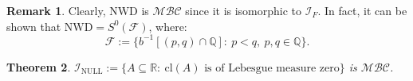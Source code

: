 \documentclass{amsart}
\newtheorem{thm}{Theorem}[section]
\newtheorem{prop}[thm]{Proposition}
\theoremstyle{definition}
\newtheorem{remark}[thm]{Remark}
\theoremstyle{definition}
\newcommand{\N}{{\mathbb N}}
\newcommand{\R}{{\mathbb R}}
\newcommand{\Q}{{\mathbb Q}}
\newcommand{\I}{\mathcal I}
\newcommand{\calI}{\mathcal{I}}
\newcommand{\MB}{S^0}  %
\newcommand{\MBC}{\mathcal{MBC}}
\newcommand{\NWD}{\mathrm{NWD}}
\newcommand{\INULL}{\calI_\mathrm{NULL}}
\newcommand{\cl}{\mathrm{cl}}
\newcommand{\negligible}{\mathcal{N}}
\begin{document}
\begin{remark}
Clearly, $\NWD$ is $\MBC$ since it is isomorphic to $\I_F$. In fact, it can be shown that $\NWD = \MB(\mathcal{F})$, where:
$$\mathcal{F} := \{b^{-1}[(p, q)\cap\Q] :\ p < q,\ p, q \in \Q\}.$$
\end{remark}

%

\begin{thm}
$\INULL := \{A \subseteq\R :\ \cl(A) \textrm{ is of Lebesgue measure zero}\}$ is $\MBC$.
\end{thm}
\end{document}
